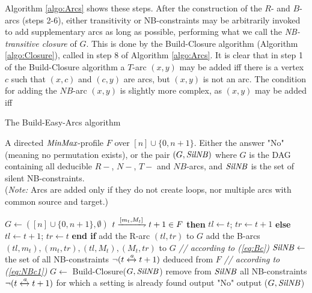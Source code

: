 \documentclass{article}
\newcommand{\M}{\mbox{\it MinMax}}
\newcommand{\n}{[n]}
\newcommand{\lrf}[1]{\xleftrightarrow{#1}}
\newcommand{\rf}[1]{\xrightharpoondown{#1}}
\newcommand{\Sil}{{\it SilNB}}
\begin{document}
Algorithm \ref{algo:Arcs} shows these steps. After the construction of the $R$- and $B$-arcs (steps
2-6), either transitivity or NB-constraints may be arbitrarily invoked to add supplementary
arcs as long as possible, performing what we call the {\em NB-transitive closure}
of $G$. This is done by the Build-Closure algorithm (Algorithm \ref{algo:Closure}), called in
step 8 of Algorithm \ref{algo:Arcs}. It is clear that in step 1 of the Build-Closure algorithm
a $T$-arc $(x,y)$ may be added iff there is a vertex
$c$  such that $(x,c)$ and $(c,y)$ are arcs, but $(x,y)$ is not an arc. The condition for
adding the $NB$-arc $(x,y)$ is slightly more complex, as $(x,y)$ may be added iff

\begin{algorithm}[t,boxed]
\caption{The Build-Easy-Arcs algorithm}
\begin{algorithmic}[1]
{\small \REQUIRE A directed $\M$-profile $F$ over $\n\cup\{0,n+1\}$.
\ENSURE  Either the answer "No" (meaning no permutation exists), or the pair 
$(G, \Sil)$ where $G$ is the DAG containing all deducible $R-$, $N-$, $T-$ and $NB$-arcs, and
$\Sil$ is the set of silent NB-constraints. \\
\hspace*{-0.6cm}({\sl  Note:} Arcs are added only if they do not create loops, nor multiple arcs with common source and target.)

\medskip

\STATE $G\leftarrow (\n\cup\{0,n+1\}, \emptyset)$
 $t\rf{[m_t, M_t]} t+1\in F$ {\bf then} $tl\leftarrow t$; $tr\leftarrow t+1$ {\bf else}   $tl\leftarrow t+1$; $tr\leftarrow t$ {\bf end if}
\STATE add the R-arc $(tl,tr)$ to $G$
\STATE add the B-arcs $(tl,m_t), (m_t,tr),(tl,M_t), (M_t,tr)$ to $G$ {\sl \hfill // according to (\ref{eq:Bc})}
\ENDFOR
\STATE $\Sil\leftarrow$ the set of all NB-constraints $\neg(t\lrf{a}t+1)$ deduced from $F$  {\sl \hfill // according to (\ref{eq:NBc1})}
\STATE $G\leftarrow$ Build-Closure($G,\Sil$)
\STATE remove from $\Sil$ all NB-constraints $\neg(t\lrf{a}t+1)$ for which a setting is already found
\STATE output "No"
\ELSE
\STATE output ($G, \Sil$)
\ENDIF}
\end{algorithmic}
\label{algo:Arcs}
\end{algorithm}
\end{document}
